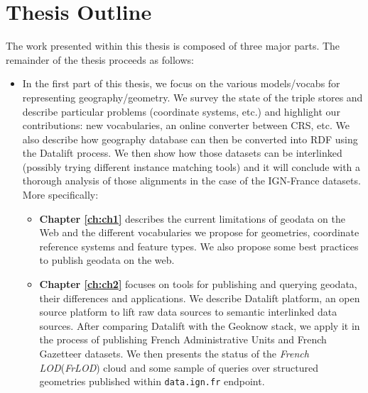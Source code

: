 \section{Thesis Outline}
\label{sec:thesis-structure}

The work presented within this thesis is composed of three major parts. The remainder of the thesis proceeds as follows:

\begin{itemize}
\item In the first part of this thesis, we focus on the various models/vocabs for representing geography/geometry. We survey the state of the triple stores and describe particular problems (coordinate systems, etc.) and highlight our contributions: new vocabularies, an online converter between CRS, etc. We also describe how geography database can then be converted into RDF using the Datalift process. We then show how those datasets can be interlinked (possibly trying different instance matching tools) and it will conclude with a thorough analysis of those alignments in the case of the IGN-France datasets. More specifically:

 \begin{itemize}
  \item \textbf{Chapter \ref{ch:ch1}} describes the current limitations of geodata on the Web and the different vocabularies we propose for geometries, coordinate reference systems and feature  types. We also propose  some best practices to publish geodata on the web.
  \item \textbf{Chapter \ref{ch:ch2}} focuses on tools for publishing and querying geodata, their differences and applications. We describe Datalift platform, an open source platform to lift raw data sources to semantic interlinked data sources. After comparing Datalift with the Geoknow stack, we apply it in the process of publishing French Administrative Units and French Gazetteer datasets. We then presents the status of the \textit{French LOD}(\textit{FrLOD}) cloud and some sample of queries over structured geometries published within \texttt{data.ign.fr} endpoint. 
 \end{itemize}


\end{itemize}
